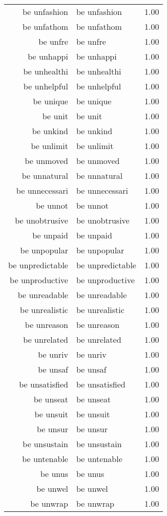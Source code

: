 \begin{table}[ht]
\begin{tabular}{rlr}
  be unfashion & be unfashion & 1.00 \\ 
  be unfathom & be unfathom & 1.00 \\ 
  be unfre & be unfre & 1.00 \\ 
  be unhappi & be unhappi & 1.00 \\ 
  be unhealthi & be unhealthi & 1.00 \\ 
  be unhelpful & be unhelpful & 1.00 \\ 
  be unique & be unique & 1.00 \\ 
  be unit & be unit & 1.00 \\ 
  be unkind & be unkind & 1.00 \\ 
  be unlimit & be unlimit & 1.00 \\ 
  be unmoved & be unmoved & 1.00 \\ 
  be unnatural & be unnatural & 1.00 \\ 
  be unnecessari & be unnecessari & 1.00 \\ 
  be unnot & be unnot & 1.00 \\ 
  be unobtrusive & be unobtrusive & 1.00 \\ 
  be unpaid & be unpaid & 1.00 \\ 
  be unpopular & be unpopular & 1.00 \\ 
  be unpredictable & be unpredictable & 1.00 \\ 
  be unproductive & be unproductive & 1.00 \\ 
  be unreadable & be unreadable & 1.00 \\ 
  be unrealistic & be unrealistic & 1.00 \\ 
  be unreason & be unreason & 1.00 \\ 
  be unrelated & be unrelated & 1.00 \\ 
  be unriv & be unriv & 1.00 \\ 
  be unsaf & be unsaf & 1.00 \\ 
  be unsatisfied & be unsatisfied & 1.00 \\ 
  be unseat & be unseat & 1.00 \\ 
  be unsuit & be unsuit & 1.00 \\ 
  be unsur & be unsur & 1.00 \\ 
  be unsustain & be unsustain & 1.00 \\ 
  be untenable & be untenable & 1.00 \\ 
  be unus & be unus & 1.00 \\ 
  be unwel & be unwel & 1.00 \\ 
  be unwrap & be unwrap & 1.00 \\ 

\end{tabular}
\end{table}

